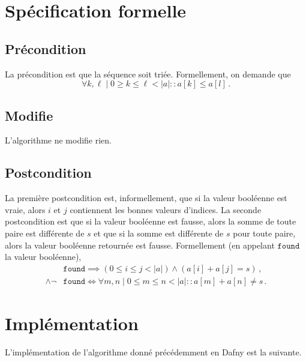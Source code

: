 \documentclass{elsarticle}
\newcommand{\abs}[1]{\left\lvert#1\right\lvert}
\begin{document}
\section{Spécification formelle}
\subsection{Précondition}
La précondition est que la séquence soit triée.
Formellement, on demande que
\[
\forall k, \ell \mid 0 \ge k \le \ell < \abs{a} :: a[k] \le a[l]\,.
\]
\subsection{Modifie}
L'algorithme ne modifie rien.
\subsection{Postcondition}
La première postcondition est, informellement, que si la valeur booléenne est vraie,
alors $i$ et $j$ contiennent les bonnes valeurs d'indices.
La seconde postcondition est que si la valeur booléenne est fausse,
alors la somme de toute paire est différente de $s$ et que si la somme est différente de $s$ pour toute paire, alors la valeur booléenne retournée est fausse.
Formellement (en appelant $\texttt{found}$ la valeur booléenne),
\begin{align*}
&\texttt{found} \implies (0 \le i \le j < \abs{a}) \land (a[i] + a[j] = s)\,, \\
\land \lnot &\texttt{found} \iff \forall m, n \mid 0 \le m \le n < \abs{a} :: a[m] + a[n] \ne s\,.
\end{align*}

\section{Implémentation}
L'implémentation de l'algorithme donné précédemment en Dafny est la suivante.
\end{document}

